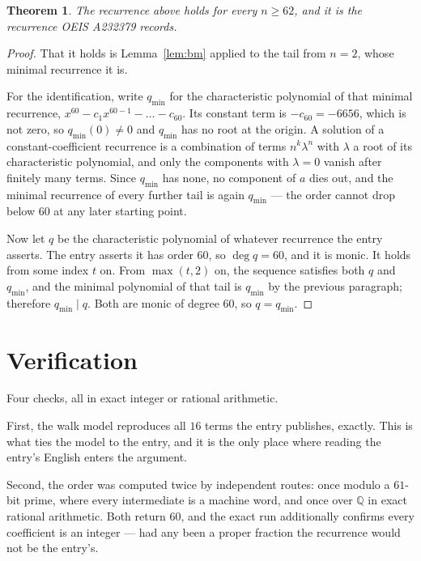 \documentclass[11pt,a4paper]{article}
\theoremstyle{plain}
\newtheorem{theorem}{Theorem}
\theoremstyle{definition}
\begin{document}
\begin{theorem}
The recurrence above holds for every $n\ge62$, and it is the recurrence OEIS A232379 records.
\end{theorem}

\begin{proof}
That it holds is Lemma~\ref{lem:bm} applied to the tail from $n=2$, whose minimal
recurrence it is.

For the identification, write $q_{\min}$ for the characteristic polynomial of that minimal
recurrence, $x^{60}-c_1x^{60-1}-\dots-c_{60}$. Its constant term is
$-c_{60}=-6656$, which is not zero, so $q_{\min}(0)\neq0$ and $q_{\min}$ has no
root at the origin. A solution of a constant-coefficient recurrence is a combination of terms
$n^{k}\lambda^{n}$ with $\lambda$ a root of its characteristic polynomial, and only the
components with $\lambda=0$ vanish after finitely many terms. Since $q_{\min}$ has none, no
component of $a$ dies out, and the minimal recurrence of every further tail is again
$q_{\min}$ --- the order cannot drop below $60$ at any later starting point.

Now let $q$ be the characteristic polynomial of whatever recurrence the entry asserts. The
entry asserts it has order $60$, so $\deg q=60$, and it is monic. It holds from some
index $t$ on. From $\max(t,2)$ on, the sequence satisfies both $q$ and $q_{\min}$, and
the minimal polynomial of that tail is $q_{\min}$ by the previous paragraph; therefore
$q_{\min}\mid q$. Both are monic of degree $60$, so $q=q_{\min}$.
\end{proof}

\section{Verification}

Four checks, all in exact integer or rational arithmetic.

First, the walk model reproduces all $16$ terms the entry publishes, exactly. This is
what ties the model to the entry, and it is the only place where reading the entry's English
enters the argument.

Second, the order was computed twice by independent routes: once modulo a $61$-bit prime, where
every intermediate is a machine word, and once over $\mathbb{Q}$ in exact rational arithmetic.
Both return $60$, and the exact run additionally confirms every coefficient is an integer
--- had any been a proper fraction the recurrence would not be the entry's.
\end{document}
